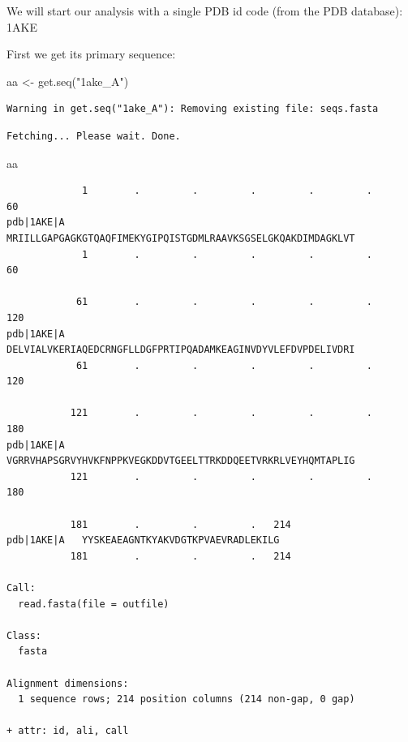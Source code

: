 \documentclass[
  letterpaper,
  DIV=11,
  numbers=noendperiod]{scrartcl}
\newenvironment{Shaded}{\begin{snugshade}}{\end{snugshade}}
\newcommand{\FunctionTok}[1]{\textcolor[rgb]{0.28,0.35,0.67}{#1}}
\newcommand{\NormalTok}[1]{\textcolor[rgb]{0.00,0.23,0.31}{#1}}
\newcommand{\OtherTok}[1]{\textcolor[rgb]{0.00,0.23,0.31}{#1}}
\newcommand{\StringTok}[1]{\textcolor[rgb]{0.13,0.47,0.30}{#1}}
\begin{document}
We will start our analysis with a single PDB id code (from the PDB
database): 1AKE

First we get its primary sequence:

\begin{Shaded}
\begin{Highlighting}[]
\NormalTok{aa }\OtherTok{\textless{}{-}} \FunctionTok{get.seq}\NormalTok{(}\StringTok{"1ake\_A"}\NormalTok{)}
\end{Highlighting}
\end{Shaded}

\begin{verbatim}
Warning in get.seq("1ake_A"): Removing existing file: seqs.fasta
\end{verbatim}

\begin{verbatim}
Fetching... Please wait. Done.
\end{verbatim}

\begin{Shaded}
\begin{Highlighting}[]
\NormalTok{aa}
\end{Highlighting}
\end{Shaded}

\begin{verbatim}
             1        .         .         .         .         .         60 
pdb|1AKE|A   MRIILLGAPGAGKGTQAQFIMEKYGIPQISTGDMLRAAVKSGSELGKQAKDIMDAGKLVT
             1        .         .         .         .         .         60 

            61        .         .         .         .         .         120 
pdb|1AKE|A   DELVIALVKERIAQEDCRNGFLLDGFPRTIPQADAMKEAGINVDYVLEFDVPDELIVDRI
            61        .         .         .         .         .         120 

           121        .         .         .         .         .         180 
pdb|1AKE|A   VGRRVHAPSGRVYHVKFNPPKVEGKDDVTGEELTTRKDDQEETVRKRLVEYHQMTAPLIG
           121        .         .         .         .         .         180 

           181        .         .         .   214 
pdb|1AKE|A   YYSKEAEAGNTKYAKVDGTKPVAEVRADLEKILG
           181        .         .         .   214 

Call:
  read.fasta(file = outfile)

Class:
  fasta

Alignment dimensions:
  1 sequence rows; 214 position columns (214 non-gap, 0 gap) 

+ attr: id, ali, call
\end{verbatim}
\end{document}
